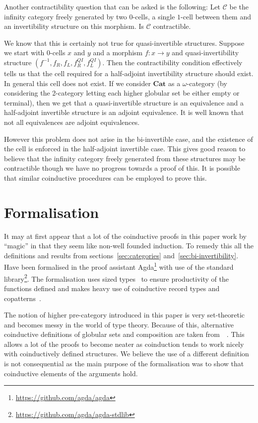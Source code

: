 \documentclass[draft]{article}
\newcommand{\inv}[1]{#1^{-1}} \newcommand{\comp}{\star}
\begin{document}
Another contractibility question that can be asked is the following:
Let \(\mathcal{C}\) be the infinity category freely generated by two
\(0\)-cells, a single \(1\)-cell between them and an invertibility
structure on this morphism. Is \(\mathcal{C}\) contractible.

We know that this is certainly not true for quasi-invertible
structures. Suppose we start with \(0\)-cells \(x\) and \(y\) and a
morphism \(f : x \to y\) and quasi-invertibility structure \((\inv f,
f_R, f_L, f_R^{QI}, f_L^{QI})\). Then the contractibility condition
effectively tells us that the cell required for a half-adjoint
invertibility structure should exist. In general this cell does not
exist. If we consider \(\mathbf{Cat}\) as a \(\omega\)-category (by
considering the 2-category letting each higher globular set be either
empty or terminal), then we get that a quasi-invertible structure is
an equivalence and a half-adjoint invertible structure is an adjoint
equivalence. It is well known that not all equivalences are adjoint
equivalences.

However this problem does not arise in the bi-invertible case, and the
existence of the cell is enforced in the half-adjoint invertible case.
This gives good reason to believe that the infinity category freely
generated from these structures may be contractible though we have no
progress towards a proof of this. It is possible that similar
coinductive procedures can be employed to prove this.

\section{Formalisation}\label{sec:formalisation}

It may at first appear that a lot of the coinductive proofs in this
paper work by ``magic'' in that they seem like non-well founded
induction. To remedy this all the definitions and results from
sections~\ref{sec:categories} and~\ref{sec:bi-invertibility}. Have
been formalised in the proof assistant
Agda\footnote{\url{https://github.com/agda/agda}} with use of the
standard library\footnote{\url{https://github.com/agda/agda-stdlib}}.
The formalisation uses sized types~\cite{Abel_2010} to ensure
productivity of the functions defined and makes heavy use of
coinductive record types and
copatterns~\cite{10.1145/2480359.2429075}.

The notion of higher pre-category introduced in this paper is very
set-theoretic and becomes messy in the world of type theory. Because
of this, alternative coinductive definitions of globular sets and
composition are taken
from~~\cite{hirschowitz_et_al:LIPIcs:2015:5166}.
This allows a lot of the proofs to become neater as coinduction tends
to work nicely with coinductively defined structures. We believe the
use of a different definition is not consequential as the main purpose
of the formalisation was to show that coinductive elements of the
arguments hold.
\end{document}
